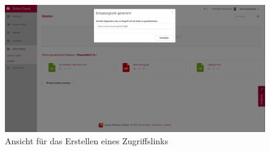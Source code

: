 \begin{figure}[H]
	\centering
	\includegraphics[width=1\linewidth]{images/sharingfileui}
	\caption{Ansicht für das Erstellen eines Zugriffslinks}
	\label{fig:sharingfileui}
\end{figure}
\clearpage